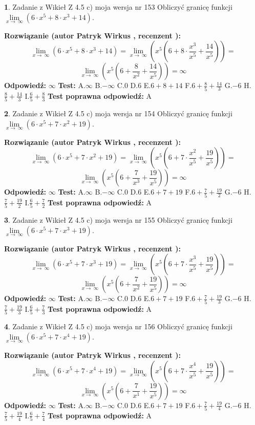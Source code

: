 \documentclass[12pt, a4paper]{article}
\theoremstyle{definition} %
\newtheorem{zad}{}
\newcommand{\zadStart}[1]{\begin{zad}#1\newline}
\newcommand{\zadStop}{\end{zad}}
\newcommand{\rozwStart}[2]{\noindent \textbf{Rozwiązanie (autor #1 , recenzent #2): }\newline}
\newcommand{\rozwStop}{\newline}
\newcommand{\odpStart}{\noindent \textbf{Odpowiedź:}\newline}
\newcommand{\odpStop}{\newline}
\newcommand{\testStart}{\noindent \textbf{Test:}\newline}
\newcommand{\testStop}{\newline}
\newcommand{\kluczStart}{\noindent \textbf{Test poprawna odpowiedź:}\newline}
\newcommand{\kluczStop}{\newline}
\begin{document}
\zadStart{Zadanie z Wikieł Z 4.5 c) moja wersja nr 153}
Obliczyć granicę funkcji  $\lim\limits_{x\to\ \infty}(6 \cdot x^{5}+8 \cdot x^{3}+14)$.
\zadStop
\rozwStart{Patryk Wirkus}{}
$$\lim\limits_{x\to\ \infty}(6 \cdot x^{5}+8 \cdot x^{3}+14) = \lim\limits_{x\to\ \infty}(x^{5}(6 +8 \cdot \frac{x^{3}}{x^{5}}+\frac{14}{x^{5}})) =$$ $$\lim\limits_{x\to\ \infty}(x^{5}(6 +\frac{8}{x^{2}}+\frac{14}{x^{5}})) =\infty$$
\rozwStop
\odpStart
$\infty$
\odpStop
\testStart
A.$\infty$ B.$-\infty$ C.$0$ D.$6$ E.$6 + 8 + 14$
F.$6+\frac{8}{5}+\frac{14}{3}$ G.$-6$
H.$\frac{8}{5}+\frac{14}{3}$
I.$\frac{6}{5}+\frac{8}{3}$
\testStop
\kluczStart
A
\kluczStop



\zadStart{Zadanie z Wikieł Z 4.5 c) moja wersja nr 154}
Obliczyć granicę funkcji  $\lim\limits_{x\to\ \infty}(6 \cdot x^{5}+7 \cdot x^{2}+19)$.
\zadStop
\rozwStart{Patryk Wirkus}{}
$$\lim\limits_{x\to\ \infty}(6 \cdot x^{5}+7 \cdot x^{2}+19) = \lim\limits_{x\to\ \infty}(x^{5}(6 +7 \cdot \frac{x^{2}}{x^{5}}+\frac{19}{x^{5}})) =$$ $$\lim\limits_{x\to\ \infty}(x^{5}(6 +\frac{7}{x^{3}}+\frac{19}{x^{5}})) =\infty$$
\rozwStop
\odpStart
$\infty$
\odpStop
\testStart
A.$\infty$ B.$-\infty$ C.$0$ D.$6$ E.$6 + 7 + 19$
F.$6+\frac{7}{5}+\frac{19}{2}$ G.$-6$
H.$\frac{7}{5}+\frac{19}{2}$
I.$\frac{6}{5}+\frac{7}{2}$
\testStop
\kluczStart
A
\kluczStop



\zadStart{Zadanie z Wikieł Z 4.5 c) moja wersja nr 155}
Obliczyć granicę funkcji  $\lim\limits_{x\to\ \infty}(6 \cdot x^{5}+7 \cdot x^{3}+19)$.
\zadStop
\rozwStart{Patryk Wirkus}{}
$$\lim\limits_{x\to\ \infty}(6 \cdot x^{5}+7 \cdot x^{3}+19) = \lim\limits_{x\to\ \infty}(x^{5}(6 +7 \cdot \frac{x^{3}}{x^{5}}+\frac{19}{x^{5}})) =$$ $$\lim\limits_{x\to\ \infty}(x^{5}(6 +\frac{7}{x^{2}}+\frac{19}{x^{5}})) =\infty$$
\rozwStop
\odpStart
$\infty$
\odpStop
\testStart
A.$\infty$ B.$-\infty$ C.$0$ D.$6$ E.$6 + 7 + 19$
F.$6+\frac{7}{5}+\frac{19}{3}$ G.$-6$
H.$\frac{7}{5}+\frac{19}{3}$
I.$\frac{6}{5}+\frac{7}{3}$
\testStop
\kluczStart
A
\kluczStop



\zadStart{Zadanie z Wikieł Z 4.5 c) moja wersja nr 156}
Obliczyć granicę funkcji  $\lim\limits_{x\to\ \infty}(6 \cdot x^{5}+7 \cdot x^{4}+19)$.
\zadStop
\rozwStart{Patryk Wirkus}{}
$$\lim\limits_{x\to\ \infty}(6 \cdot x^{5}+7 \cdot x^{4}+19) = \lim\limits_{x\to\ \infty}(x^{5}(6 +7 \cdot \frac{x^{4}}{x^{5}}+\frac{19}{x^{5}})) =$$ $$\lim\limits_{x\to\ \infty}(x^{5}(6 +\frac{7}{x^{1}}+\frac{19}{x^{5}})) =\infty$$
\rozwStop
\odpStart
$\infty$
\odpStop
\testStart
A.$\infty$ B.$-\infty$ C.$0$ D.$6$ E.$6 + 7 + 19$
F.$6+\frac{7}{5}+\frac{19}{4}$ G.$-6$
H.$\frac{7}{5}+\frac{19}{4}$
I.$\frac{6}{5}+\frac{7}{4}$
\testStop
\kluczStart
A
\kluczStop
\end{document}
